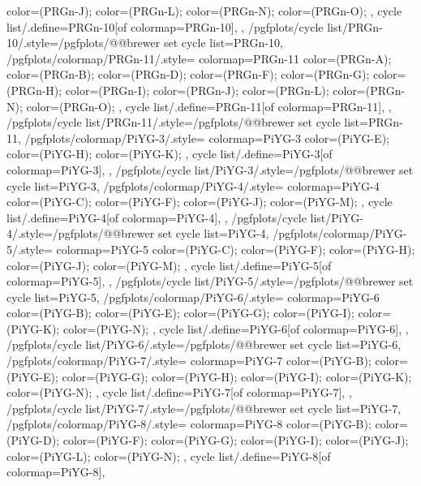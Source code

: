 {{{      color=(PRGn-J);
      color=(PRGn-L);
      color=(PRGn-N);
      color=(PRGn-O);
    },
    cycle list/.define={PRGn-10}{[of colormap=PRGn-10]},
  },
  /pgfplots/cycle list/PRGn-10/.style={/pgfplots/@@brewer set cycle list={PRGn-10}},
  /pgfplots/colormap/PRGn-11/.style={
    colormap={PRGn-11}{
      color=(PRGn-A);
      color=(PRGn-B);
      color=(PRGn-D);
      color=(PRGn-F);
      color=(PRGn-G);
      color=(PRGn-H);
      color=(PRGn-I);
      color=(PRGn-J);
      color=(PRGn-L);
      color=(PRGn-N);
      color=(PRGn-O);
    },
    cycle list/.define={PRGn-11}{[of colormap=PRGn-11]},
  },
  /pgfplots/cycle list/PRGn-11/.style={/pgfplots/@@brewer set cycle list={PRGn-11}},
  /pgfplots/colormap/PiYG-3/.style={
    colormap={PiYG-3}{
      color=(PiYG-E);
      color=(PiYG-H);
      color=(PiYG-K);
    },
    cycle list/.define={PiYG-3}{[of colormap=PiYG-3]},
  },
  /pgfplots/cycle list/PiYG-3/.style={/pgfplots/@@brewer set cycle list={PiYG-3}},
  /pgfplots/colormap/PiYG-4/.style={
    colormap={PiYG-4}{
      color=(PiYG-C);
      color=(PiYG-F);
      color=(PiYG-J);
      color=(PiYG-M);
    },
    cycle list/.define={PiYG-4}{[of colormap=PiYG-4]},
  },
  /pgfplots/cycle list/PiYG-4/.style={/pgfplots/@@brewer set cycle list={PiYG-4}},
  /pgfplots/colormap/PiYG-5/.style={
    colormap={PiYG-5}{
      color=(PiYG-C);
      color=(PiYG-F);
      color=(PiYG-H);
      color=(PiYG-J);
      color=(PiYG-M);
    },
    cycle list/.define={PiYG-5}{[of colormap=PiYG-5]},
  },
  /pgfplots/cycle list/PiYG-5/.style={/pgfplots/@@brewer set cycle list={PiYG-5}},
  /pgfplots/colormap/PiYG-6/.style={
    colormap={PiYG-6}{
      color=(PiYG-B);
      color=(PiYG-E);
      color=(PiYG-G);
      color=(PiYG-I);
      color=(PiYG-K);
      color=(PiYG-N);
    },
    cycle list/.define={PiYG-6}{[of colormap=PiYG-6]},
  },
  /pgfplots/cycle list/PiYG-6/.style={/pgfplots/@@brewer set cycle list={PiYG-6}},
  /pgfplots/colormap/PiYG-7/.style={
    colormap={PiYG-7}{
      color=(PiYG-B);
      color=(PiYG-E);
      color=(PiYG-G);
      color=(PiYG-H);
      color=(PiYG-I);
      color=(PiYG-K);
      color=(PiYG-N);
    },
    cycle list/.define={PiYG-7}{[of colormap=PiYG-7]},
  },
  /pgfplots/cycle list/PiYG-7/.style={/pgfplots/@@brewer set cycle list={PiYG-7}},
  /pgfplots/colormap/PiYG-8/.style={
    colormap={PiYG-8}{
      color=(PiYG-B);
      color=(PiYG-D);
      color=(PiYG-F);
      color=(PiYG-G);
      color=(PiYG-I);
      color=(PiYG-J);
      color=(PiYG-L);
      color=(PiYG-N);
    },
    cycle list/.define={PiYG-8}{[of colormap=PiYG-8]},
}}
